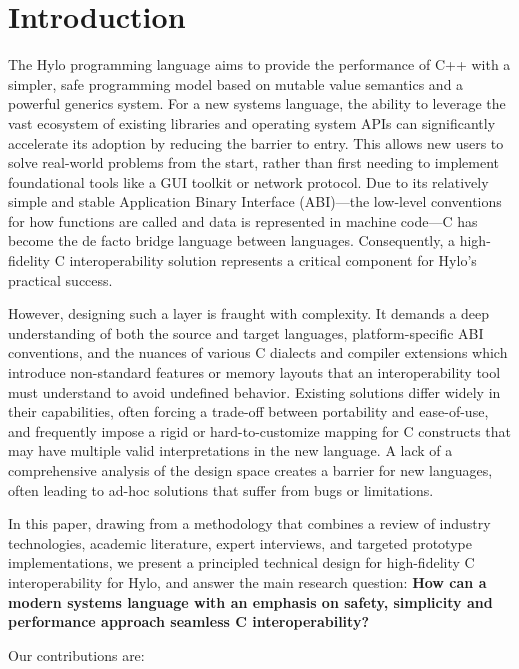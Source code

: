 \newpage
\section{Introduction}

The Hylo programming language aims to provide the performance of C++ with a simpler, safe programming model based on mutable value semantics and a powerful generics system. For a new systems language, the ability to leverage the vast ecosystem of existing libraries and operating system APIs can significantly accelerate its adoption by reducing the barrier to entry. This allows new users to solve real-world problems from the start, rather than first needing to implement foundational tools like a GUI toolkit or network protocol. Due to its relatively simple and stable Application Binary Interface (ABI)—the low-level conventions for how functions are called and data is represented in machine code—C has become the de facto bridge language between languages. Consequently, a high-fidelity C interoperability solution represents a critical component for Hylo's practical success.

However, designing such a layer is fraught with complexity. It demands a deep understanding of both the source and target languages, platform-specific ABI conventions, and the nuances of various C dialects and compiler extensions which introduce non-standard features or memory layouts that an interoperability tool must understand to avoid undefined behavior. Existing solutions differ widely in their capabilities, often forcing a trade-off between portability and ease-of-use, and frequently impose a rigid or hard-to-customize mapping for C constructs that may have multiple valid interpretations in the new language. A lack of a comprehensive analysis of the design space creates a barrier for new languages, often leading to ad-hoc solutions that suffer from bugs or limitations.

In this paper, drawing from a methodology that combines a review of industry technologies, academic literature, expert interviews, and targeted prototype implementations, we present a principled technical design for high-fidelity C interoperability for Hylo, and answer the main research question: \textbf{How can a modern systems language with an emphasis on safety, simplicity and performance approach seamless C interoperability?}

Our contributions are:

